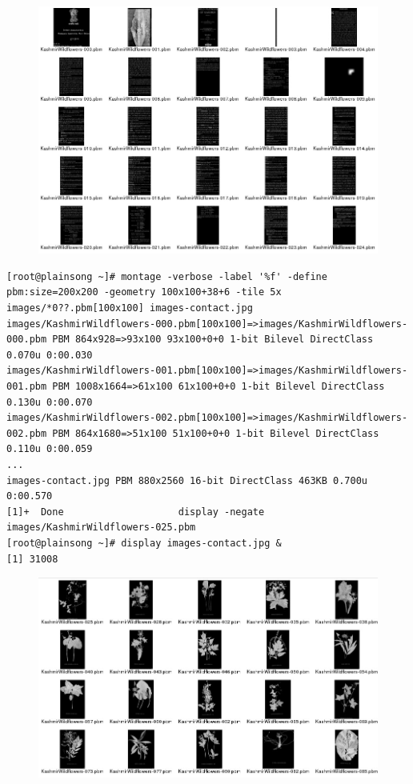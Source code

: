 \documentclass[10pt]{article}
\begin{document}
\begin{figure}[!h]
\includegraphics[scale=0.37]{Contact_sheet1.png}
\centering
\end{figure}
\begin{Verbatim}[fontsize=\scriptsize]
[root@plainsong ~]# montage -verbose -label '%f' -define pbm:size=200x200 -geometry 100x100+38+6 -tile 5x images/*0??.pbm[100x100] images-contact.jpg
images/KashmirWildflowers-000.pbm[100x100]=>images/KashmirWildflowers-000.pbm PBM 864x928=>93x100 93x100+0+0 1-bit Bilevel DirectClass 0.070u 0:00.030
images/KashmirWildflowers-001.pbm[100x100]=>images/KashmirWildflowers-001.pbm PBM 1008x1664=>61x100 61x100+0+0 1-bit Bilevel DirectClass 0.130u 0:00.070
images/KashmirWildflowers-002.pbm[100x100]=>images/KashmirWildflowers-002.pbm PBM 864x1680=>51x100 51x100+0+0 1-bit Bilevel DirectClass 0.110u 0:00.059
...
images-contact.jpg PBM 880x2560 16-bit DirectClass 463KB 0.700u 0:00.570
[1]+  Done                    display -negate images/KashmirWildflowers-025.pbm
[root@plainsong ~]# display images-contact.jpg &
[1] 31008
\end{Verbatim}
\begin{figure}[!h]
\includegraphics[scale=0.37]{Contact_sheet2.png}
\centering
\end{figure}
\end{document}
